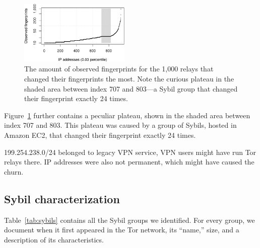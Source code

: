 \begin{figure}[t]
	\centering
	\includegraphics[width=0.47\textwidth]{diagrams/fingerprints.pdf}
	\caption{The amount of observed fingerprints for the 1,000 relays that
	changed their fingerprints the most.  Note the curious plateau in the shaded
	area between index 707 and 803---a Sybil group that changed their
	fingerprint exactly 24 times.}
	\label{fig:fingerprints}
\end{figure}

Figure~\ref{fig:fingerprints} further contains a peculiar plateau, shown in the
shaded area between index 707 and 803.  This plateau was caused by a group of
Sybils, hosted in Amazon EC2, that changed their fingerprint exactly 24 times.

199.254.238.0/24
belonged to legacy VPN service, VPN users might have run Tor relays there.
IP addresses were also not permanent, which might have caused the churn.

\subsection{Sybil characterization}
\label{sec:sybil_groups}
Table~\ref{tab:sybils} contains all the Sybil groups we identified.  For every
group, we document when it first appeared in the Tor network, its ``name,''
size, and a description of its characteristics.

